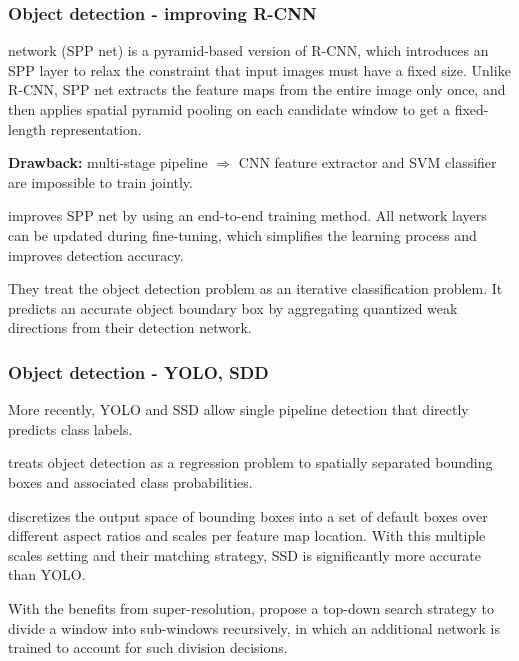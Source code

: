 \begin{frame}[allowframebreaks]
\end{frame}


\begin{frame}
	\frametitle{Object detection - improving R-CNN}


	 network (SPP net) is a pyramid-based version of R-CNN, which introduces an SPP layer to relax the constraint that input images must have a fixed size. Unlike R-CNN, SPP net extracts the feature maps from the entire image only once, and then applies spatial pyramid pooling on each candidate window to get a fixed-length representation.

\textbf{Drawback:} multi-stage pipeline $\Rightarrow$ CNN feature extractor and SVM classifier are impossible to train jointly.

	\medskip


	 improves SPP net by using an end-to-end training method. All network layers can be updated during fine-tuning, which simplifies the learning process and improves detection accuracy.

	\medskip


	They treat the object detection problem as an iterative classification problem. It predicts an accurate object boundary box by aggregating quantized weak directions from their detection network.

\end{frame}


\begin{frame}
	\frametitle{Object detection - YOLO, SDD}


	More recently, YOLO \cite{redmon2016you} and SSD \cite{liu2016ssd} allow single pipeline detection that directly predicts class labels.

	\medskip

	 treats object detection as a regression problem to spatially separated bounding boxes and associated class probabilities.

	\medskip

	 discretizes the output space of bounding boxes into a set of default boxes over different aspect ratios and scales per feature map location. With this multiple scales setting and their matching strategy, SSD is significantly more accurate than YOLO.

	\medskip

	\bigskip

	With the benefits from super-resolution, \cite{lu2016adaptive} propose a top-down search strategy to divide a window into sub-windows recursively, in which an additional network is trained to account for such division decisions.

\end{frame}

